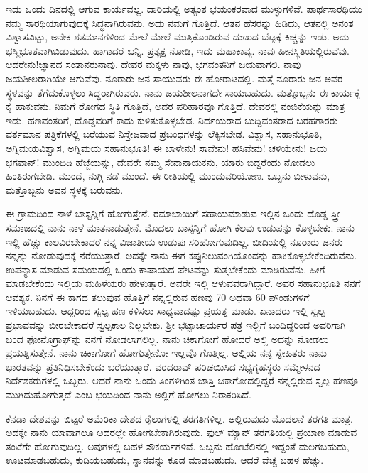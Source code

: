 ಇದು ಒಂದು ದಿನದಲ್ಲಿ ಆಗುವ ಕಾರ್ಯವಲ್ಲ. ದಾರಿಯಲ್ಲಿ ಅತ್ಯಂತ ಭಯಂಕರವಾದ ಮುಳ್ಳುಗಳಿವೆ. ಪಾರ್ಥಸಾರಥಿಯು ನಮ್ಮ ಸಾರಥಿಯಾಗುವುದಕ್ಕೆ ಸಿದ್ಧನಾಗಿರುವನು. ಅದು ನಮಗೆ ಗೊತ್ತಿದೆ. ಆತನ ಹೆಸರನ್ನು ಹಿಡಿದು, ಆತನಲ್ಲಿ ಅನಂತ ವಿಶ್ವಾಸವಿಟ್ಟು, ಅನೇಕ ಶತಮಾನಗಳಿಂದ ಮೇಲೆ ಮೇಲೆ ಮುತ್ತಿಕೊಂಡಿರುವ ದುಃಖದ ಬೆಟ್ಟಕ್ಕೆ ಕಿಚ್ಚನ್ನು ಇಡು. ಅದು ಭಸ್ಮಿಭೂತವಾಗಿಬಿಡುವುದು. ಹಾಗಾದರೆ ಬನ್ನಿ. ಪ್ರತ್ಯಕ್ಷ ನೋಡಿ, ಇದು ಮಹಾಕಾವ್ಯ. ನಾವು ಹೀನಸ್ಥಿತಿಯಲ್ಲಿರುವೆವು. ಆದರೇನು!ಜ್ಞಾನದ ಸಂತಾನರುನಾವು. ದೇವರ ಮಕ್ಕಳು ನಾವು, ಭಗವಂತನಿಗೆ ಜಯವಾಗಲಿ. ನಾವು ಜಯಶೀಲರಾಗಿಯೇ ಆಗುವೆವು. ನೂರಾರು ಜನ ಸಾಯುವರು ಈ ಹೋರಾಟದಲ್ಲಿ. ಮತ್ತೆ ನೂರಾರು ಜನ ಅವರ ಸ್ಥಳವನ್ನು ತೆಗೆದುಕೊಳ್ಳಲು ಸಿದ್ಧರಾಗಿರುವರು. ನಾನು ಜಯಶೀಲನಾಗದೇ ಸಾಯಬಹುದು. ಮತ್ತೊಬ್ಬನು ಈ ಕಾರ್ಯಕ್ಕೆ ಕೈ ಹಾಕುವನು. ನಿಮಗೆ ರೋಗದ ಸ್ಥಿತಿ ಗೊತ್ತಿದೆ, ಅದರ ಪರಿಹಾರವೂ ಗೊತ್ತಿದೆ. ದೇವರಲ್ಲಿ ನಂಬಿಕೆಯನ್ನು ಮಾತ್ರ ಇಡು. ಹಣವಂತರಿಗೆ, ದೊಡ್ಡವರಿಗೆ ಕಾದು ಕುಳಿತುಕೊಳ್ಳಬೇಡ. ನಿರ್ದಯರಾದ ಬುದ್ದಿವಂತರಾದ ಬರಹಗಾರರು ವರ್ತಮಾನ ಪತ್ರಿಕೆಗಳಲ್ಲಿ ಬರೆಯುವ ನಿಸ್ತೇಜವಾದ ಪ್ರಬಂಧಗಳನ್ನು ಲೆಕ್ಕಿಸಬೇಡ. ವಿಶ್ವಾಸ, ಸಹಾನುಭೂತಿ, ಅಗ್ನಿಮಯವಿಶ್ವಾಸ, ಅಗ್ನಿಮಯ ಸಹಾನುಭೂತಿ! ಈ ಬಾಳೇನು! ಸಾವೇನು! ಹಸಿವೇನು! ಚಳಿಯೇನು! ಜಯ ಭಗವಾನ್! ಮುಂದಿಡಿ ಹೆಜ್ಜೆಯನ್ನು, ದೇವರೇ ನಮ್ಮ ಸೇನಾನಾಯಕನು, ಯಾರು ಬಿದ್ದರೆಂದು ನೋಡಲು \enginline{-} ಹಿಂತಿರುಗಬೇಡಿ. ಮುಂದೆ, ನುಗ್ಗಿ ನಡೆ ಮುಂದೆ. ಈ ರೀತಿಯಲ್ಲಿ ಮುಂದುವರಿಯೋಣ. ಒಬ್ಬನು ಬೀಳುವನು, ಮತ್ತೊಬ್ಬನು ಅವನ ಸ್ಥಳಕ್ಕೆ ಬರುವನು.

ಈ ಗ್ರಾಮದಿಂದ ನಾಳೆ ಬಾಸ್ಟನ್ನಿಗೆ ಹೋಗುತ್ತೇನೆ. ರಮಾಬಾಯಿಗೆ ಸಹಾಯಮಾಡುವ ಇಲ್ಲಿನ ಒಂದು ದೊಡ್ಡ ಸ್ತ್ರೀ ಸಮಾಜದಲ್ಲಿ ನಾನು ನಾಳೆ ಮಾತನಾಡುತ್ತೇನೆ. ಮೊದಲು ಬಾಸ್ಟನ್ನಿಗೆ ಹೋಗಿ ಕೆಲವು ಉಡುಪನ್ನು ಕೊಳ್ಳಬೇಕು. ನಾನು ಇಲ್ಲಿ ಹೆಚ್ಚು ಕಾಲವಿರಬೇಕಾದರೆ ನನ್ನ ವಿಜಾತೀಯ ಉಡುಪು ಸರಿಹೋಗುವುದಿಲ್ಲ. ಬೀದಿಯಲ್ಲಿ ನೂರಾರು ಜನರು ನನ್ನನ್ನು ನೋಡುವುದಕ್ಕೆ ನೆರೆಯುತ್ತಾರೆ. ಅದಕ್ಕೇ ನಾನು ಈಗ ಕಪ್ಪುನಿಲುವಂಗಿಯೊಂದನ್ನು ಹಾಕಿಕೊಳ್ಳಬೇಕೆಂದಿರುವೆನು. ಉಪನ್ಯಾಸ ಮಾಡುವ ಸಮಯದಲ್ಲಿ ಒಂದು ಕಾಷಾಯದ ಪೇಟವನ್ನು ಸುತ್ತಬೇಕೆಂದು ಮಾಡಿರುವೆನು. ಹೀಗೆ ಮಾಡಬೇಕೆಂದು ಇಲ್ಲಿಯ ಮಹಿಳೆಯರು ಹೇಳುತ್ತಾರೆ. ಅವರೇ ಇಲ್ಲಿ ಆಳುವವರಾಗಿದ್ದಾರೆ. ಅವರ ಸಹಾನುಭೂತಿ ನನಗೆ ಆವಶ್ಯಕ. ನಿನಗೆ ಈ ಕಾಗದ ತಲುಪುವ ಹೊತ್ತಿಗೆ ನನ್ನಲ್ಲಿರುವ ಹಣವು 70 ಅಥವಾ 60 ಪೌಂಡುಗಳಿಗೆ ಇಳಿಯಬಹುದು. ಆದ್ದರಿಂದ ಸ್ವಲ್ಪ ಹಣ ಕಳಿಸಲು ಸಾಧ್ಯವಾದಷ್ಟು ಪ್ರಯತ್ನ ಮಾಡು. ಏನಾದರು ಇಲ್ಲಿ ಸ್ವಲ್ಪ ಪ್ರಭಾವವನ್ನು ಬೀರಬೇಕಾದರೆ ಸ್ವಲ್ಪಕಾಲ ನಿಲ್ಲಬೇಕು. ಶ‍್ರೀ ಭಟ್ಟಾಚಾರ್ಯರ ಪತ್ರ ಇಲ್ಲಿಗೆ ಬಂದಿದ್ದರಿಂದ ಅವರಿಗಾಗಿ ಬಂದ ಫೋನೊಗ್ರಾಫ್‌ನ್ನು ನನಗೆ ನೋಡಲಾಗಲಿಲ್ಲ. ನಾನು ಚಿಕಾಗೋಗೆ ಹೋದರೆ ಅಲ್ಲಿ ಅದನ್ನು ನೋಡಲು ಪ್ರಯತ್ನಿಸುತ್ತೇನೆ. ನಾನು ಚಿಕಾಗೋಗೆ ಹೋಗುತ್ತೇನೋ ಇಲ್ಲವೊ ಗೊತ್ತಿಲ್ಲ. ಅಲ್ಲಿಯ ನನ್ನ ಸ್ನೇಹಿತರು ನಾನು ಭಾರತವನ್ನು ಪ್ರತಿನಿಧಿಸಬೇಕೆಂದು ಬರೆಯುತ್ತಾರೆ. ವರದರಾವ್ ಪರಿಚಯಿಸಿದ ಸಭ್ಯಗೃಹಸ್ಥರು ಸಮ್ಮೇಳನದ ನಿರ್ದೆಶಕರುಗಳಲ್ಲಿ ಒಬ್ಬರು. ಆದರೆ ನಾನು ಒಂದು ತಿಂಗಳಿಗಿಂತ ಜಾಸ್ತಿ ಚಿಕಾಗೋದಲ್ಲಿದ್ದರೆ ನನ್ನಲ್ಲಿರುವ ಸ್ವಲ್ಪ ಹಣವೂ ಮುಗಿದುಹೋಗುತ್ತದೆ ಎಂಬ ಭಯದಿಂದ ನಾನು ಅಲ್ಲಿಗೆ ಹೋಗಲು ನಿರಾಕರಿಸಿದೆ.

ಕೆನಡಾ ದೇಶವನ್ನು ಬಿಟ್ಟರೆ ಅಮೆರಿಕಾ ದೇಶದ ರೈಲುಗಳಲ್ಲಿ ತರಗತಿಗಳಿಲ್ಲ. ಅಲ್ಲಿರುವುದು ಮೊದಲನೆ ತರಗತಿ ಮಾತ್ರ. ಅದಕ್ಕೇ ನಾನು ಯಾವಾಗಲೂ ಅದರಲ್ಲೇ ಹೋಗಬೇಕಾಗಿರುವುದು. ಫುಲ್ ಮ್ಯಾನ್ ತರಗತಿಯಲ್ಲಿ ಪ್ರಯಾಣ ಮಾಡುವ ತಂಟೆಗೇ ಹೋಗುವುದಿಲ್ಲ. ಅವುಗಳಲ್ಲಿ ಬಹಳ ಸೌಕರ್ಯಗಳಿವೆ. ಒಬ್ಬನು ಹೋಟೆಲಿನಲ್ಲಿ ಇದ್ದಂತೆ ಮಲಗಬಹುದು, ಊಟಮಾಡಬಹುದು, ಕುಡಿಯಬಹುದು, ಸ್ನಾನವನ್ನು ಕೂಡ ಮಾಡಬಹುದು. ಆದರೆ ವೆಚ್ಚ ಬಹಳ ಹೆಚ್ಚು.

